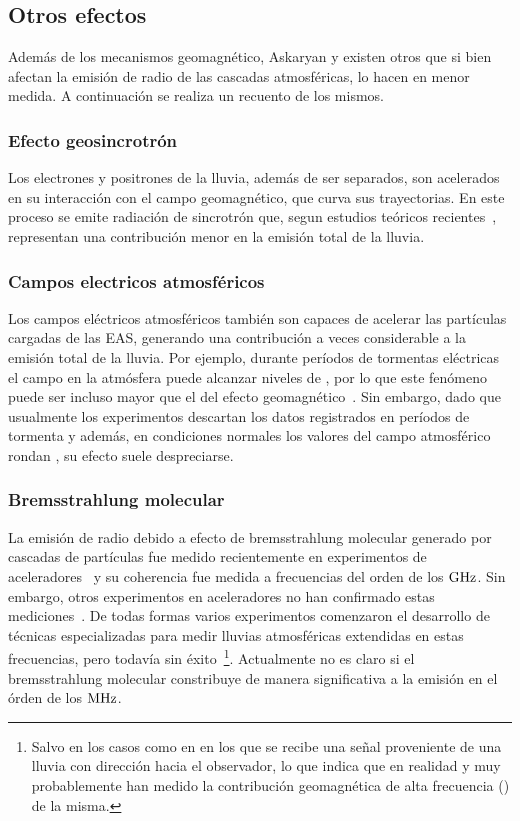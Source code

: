 \subsection{Otros efectos}
\label{sbsc:other_emision}
	
	Adem\'as de los mecanismos geomagn\'etico, Askaryan y \cher{} existen otros que si bien afectan la emisi\'on de radio de las cascadas atmosf\'ericas, lo hacen en menor medida. 
	A continuaci\'on se realiza un recuento de los mismos.
	
	\subsubsection{Efecto geosincrotr\'on}
	Los electrones y positrones de la lluvia, adem\'as de ser separados, son acelerados en su interacci\'on con el campo geomagn\'etico, que curva sus trayectorias.
	En este proceso se emite radiaci\'on de sincrotr\'on que, segun estudios te\'oricos recientes~\cite{geosintrotron}, representan una contribuci\'on menor en la emisi\'on total de la lluvia.
	
	\subsubsection{Campos electricos atmosf\'ericos}
	Los campos el\'ectricos atmosf\'ericos tambi\'en son capaces de acelerar las part\'iculas cargadas de las EAS, generando una contribuci\'on a veces considerable a la emisi\'on total de la lluvia. 
	Por ejemplo, durante per\'iodos de tormentas el\'ectricas el campo en la atm\'osfera puede alcanzar niveles de , por lo que este fen\'omeno puede ser incluso mayor que el del efecto geomagn\'etico~\cite{atmosphericField}.
	Sin embargo, dado que usualmente los experimentos descartan los datos registrados en per\'iodos de tormenta y adem\'as, en condiciones normales los valores del campo atmosf\'erico rondan , su efecto suele despreciarse.
	
	
	\subsubsection{Bremsstrahlung molecular}
	
	La emisi\'on de radio debido a efecto de bremsstrahlung molecular generado por cascadas de part\'iculas fue medido recientemente en experimentos de aceleradores~\cite{bremsstrahlungMolec} y su coherencia fue medida a frecuencias del orden de los $\rm GHz$.
	Sin embargo, otros experimentos en aceleradores no han confirmado estas mediciones~\cite{AMY}.
	De todas formas varios experimentos comenzaron el desarrollo de t\'ecnicas especializadas para medir lluvias atmosf\'ericas extendidas en estas frecuencias, pero todav\'ia sin \'exito~\cite{cite:midas}\footnote{Salvo en los casos como en \cite{cite:CHROME} en los que se recibe una se\~nal proveniente de una lluvia con direcci\'on hacia el observador, lo que indica que en realidad y muy probablemente han medido la contribuci\'on geomagn\'etica de alta frecuencia () de la misma.}.
	Actualmente no es claro si el bremsstrahlung molecular constribuye de manera significativa a la emisi\'on en el \'orden de los $\rm MHz$.
	
